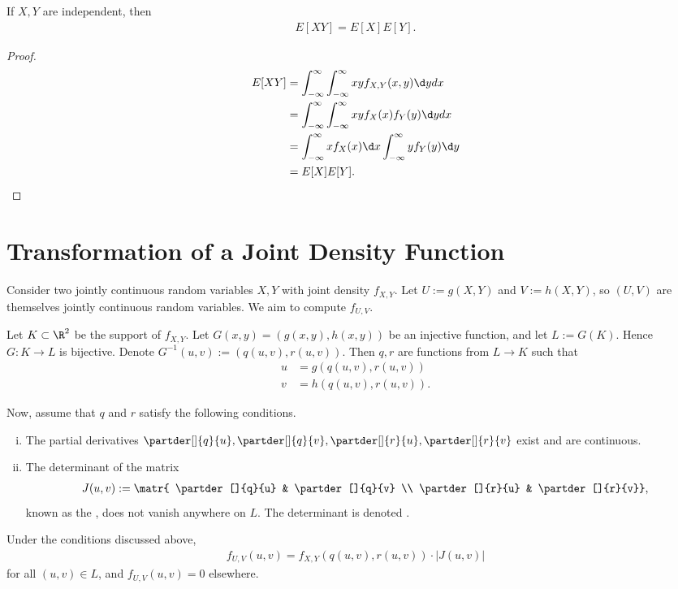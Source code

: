 \documentclass[11pt]{article}
\begin{document}
\begin{prop}
If $X,Y$ are independent, then
\begin{align*}
E[XY]=E[X]E[Y].
\end{align*}
\end{prop}

\begin{proof}
\begin{align*}
E[XY] &=\int_{-\infty}^\infty \int_{-\infty}^\infty  xy f_{X,Y}(x,y) \d y dx \\
&= \int_{-\infty}^\infty \int_{-\infty}^\infty xy f_X(x)f_Y(y) \d y dx \\ 
&= \int_{-\infty}^\infty x f_X(x)\d x \int_{-\infty}^\infty yf_Y(y)\d y \\
&= E[X]E[Y].
\end{align*}
\end{proof}

\section{Transformation of a Joint Density Function}

Consider two jointly continuous random variables $X,Y$ with joint density $f_{X,Y}$. Let $U:=g(X,Y)$ and $V:=h(X,Y)$, so $(U,V)$ are themselves jointly continuous random variables. We aim to compute $f_{U,V}$.

Let $K\subset \R^2$ be the support of $f_{X,Y}$. Let $G(x,y)=(g(x,y),h(x,y))$ be an injective function, and let $L:=G(K)$. Hence $G:K\to L$ is bijective. Denote $G^{-1}(u,v):=(q(u,v),r(u,v))$. Then $q,r$ are functions from $L \to K$ such that
\begin{align*}
u &= g(q(u,v),r(u,v)) \\ 
v &= h(q(u,v),r(u,v)).
\end{align*}

Now, assume that $q$ and $r$ satisfy the following conditions.
\begin{enumerate}[(i)]
    \item The partial derivatives $\partder[]{q}{u}, \partder[]{q}{v},\partder[]{r}{u},\partder[]{r}{v}$ exist and are continuous.
    \item The determinant of the matrix \begin{align*}
    J(u,v):=\matr{ \partder[]{q}{u} & \partder[]{q}{v} \\ \partder[]{r}{u} & \partder[]{r}{v}},
    \end{align*}
    known as the , does not vanish anywhere on $L$. The determinant is denoted .
\end{enumerate}

\begin{thm}
Under the conditions discussed above, \begin{align*}
f_{U,V}(u,v)=f_{X,Y}(q(u,v),r(u,v))\cdot |J(u,v)|
\end{align*}
for all $(u,v)\in L$, and $f_{U,V}(u,v)=0$ elsewhere.
\end{thm}
\end{document}

